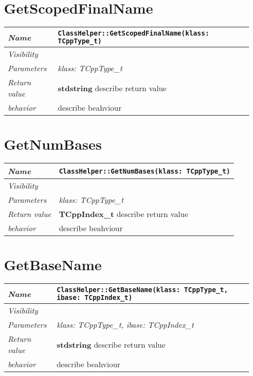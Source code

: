  \section{GetScopedFinalName}
\begin{longtable}{p{3cm} @{\hskip 1cm} p{12cm}}
 \hline
\textit{Name} & \texttt{ClassHelper::GetScopedFinalName(klass: TCppType_t)}\\
\hline
 \textit{Visibility} & \\
\hline
\textit{Parameters} & \textit{klass: TCppType_t}\\
\hline
\textit{Return value} & \textbf{ stdstring} describe return value\\
  \hline
 \textit{behavior} & describe beahviour \\
\hline
\end{longtable} \pagebreak
 \section{GetNumBases}
\begin{longtable}{p{3cm} @{\hskip 1cm} p{12cm}}
 \hline
\textit{Name} & \texttt{ClassHelper::GetNumBases(klass: TCppType_t)}\\
\hline
 \textit{Visibility} & \\
\hline
\textit{Parameters} & \textit{klass: TCppType_t}\\
\hline
\textit{Return value} & \textbf{ TCppIndex_t} describe return value\\
  \hline
 \textit{behavior} & describe beahviour \\
\hline
\end{longtable} \pagebreak
 \section{GetBaseName}
\begin{longtable}{p{3cm} @{\hskip 1cm} p{12cm}}
 \hline
\textit{Name} & \texttt{ClassHelper::GetBaseName(klass: TCppType_t, ibase: TCppIndex_t)}\\
\hline
 \textit{Visibility} & \\
\hline
\textit{Parameters} & \textit{klass: TCppType_t, ibase: TCppIndex_t}\\
\hline
\textit{Return value} & \textbf{ stdstring} describe return value\\
  \hline
 \textit{behavior} & describe beahviour \\
\hline
\end{longtable} \pagebreak
